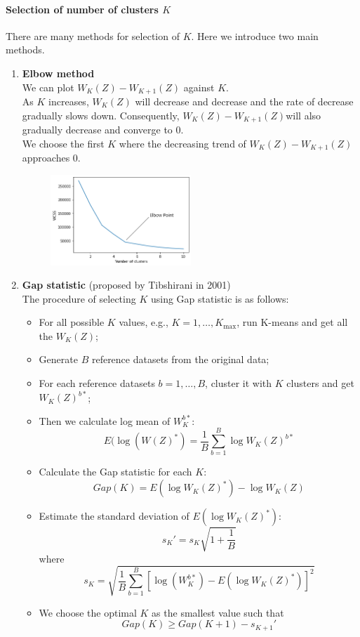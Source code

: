 \documentclass[12pt]{book}
\theoremstyle{definition}
\theoremstyle{remark}
\begin{document}
\paragraph{Selection of number of clusters $K$}
There are many methods for selection of $K$. Here we introduce two main methods.
\begin{enumerate}
    \item \textbf{Elbow method}\\
    We can plot $W_K(Z) - W_{K+1}(Z)$ against $K$. \\
    
    As $K$ increases, $W_K(Z)$ will decrease and decrease and the rate of decrease gradually slows down. Consequently, $W_K(Z) - W_{K+1}(Z)$will also gradually decrease and converge to 0. \\
    
    We choose the first $K$ where the decreasing trend of $W_K(Z) - W_{K+1}(Z)$ approaches 0.
    \begin{figure}[h]
\centering
\includegraphics[width=0.5\textwidth]{601-10-2-1.png}
\caption{}
\label{601-10-2-1}
\end{figure}
    \item \textbf{Gap statistic} (proposed by Tibshirani in 2001)\\
    The procedure of selecting $K$ using Gap statistic is as follows:
\begin{itemize}
    \item For all possible $K$ values, e.g., $K = 1,\dots, K_{\max}$, run K-means and get all the $W_K(Z)$;
    \item Generate $B$ reference datasets from the original data;
    \item For each reference datasets $b = 1,\dots,B$, cluster it with $K$ clusters and get $W_K(Z)^{b*}$;
    \item Then we calculate log mean of $W_K^{b*}$:
    \[E(\log(W(Z)^*) = \frac{1}{B}\sum_{b=1}^B \log W_K(Z)^{b*}\]
    \item Calculate the Gap statistic for each $K$:
    \[Gap(K) = E(\log W_K(Z)^*) - \log W_K(Z)\]
    \item Estimate the standard deviation of $E(\log W_K(Z)^*)$:
    \[s_K' = s_K\sqrt{1+\frac1B}\]
    where \[s_K = \sqrt{\frac1B\sum_{b=1}^B[\log(W_K^{b*}) -E(\log W_K(Z)^*)]^2}\]
    \item We choose the optimal $K$ as the smallest value such that 
    \[Gap(K) \ge Gap(K+1) - s_{K+1}'\]
\end{itemize}
\end{enumerate}
\end{document}
